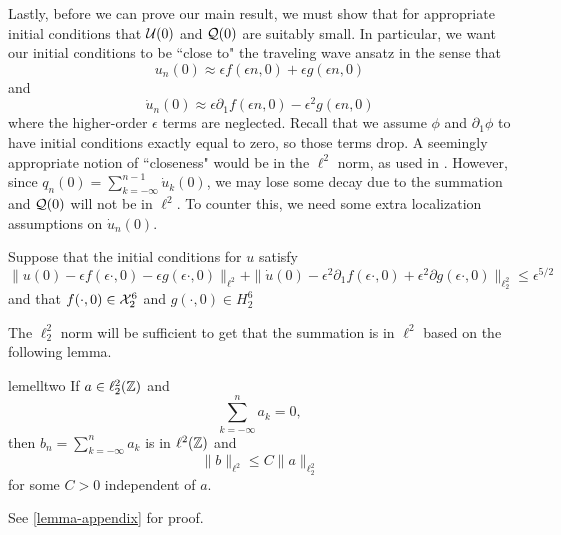 

Lastly, before we can prove our main result, we must show that for appropriate initial conditions that \(\mathcal{U}(0)\) and \(\mathcal{Q}(0)\) are suitably small. In particular, we want our initial conditions to be ``close to" the traveling wave ansatz in the sense that 
\begin{equation}
	u_n(0) \approx \epsilon f(\epsilon n , 0) + \epsilon g(\epsilon n , 0)
\end{equation}
and 
\begin{equation}
	\dot u_n(0) \approx \epsilon \partial_1 f(\epsilon n , 0) -\epsilon^2 g(\epsilon n,0)
\end{equation}
where the higher-order \(\epsilon\) terms are neglected. Recall that we assume \(\phi\) and \(\partial_1\phi\) to have initial conditions exactly equal to zero, so those terms drop. A seemingly appropriate notion of ``closeness" would be in the \(\ell^2\) norm, as used in \cite{khan2017long,schneider2000counter}. However, since \(q_n(0) = \sum_{k=-\infty}^{n-1} \dot u_{k}(0)\), we may lose some decay due to the summation and \(\mathcal{Q}(0)\) will not be in \(\ell^2\). To counter this, we need some extra localization assumptions on \(\dot u_n(0)\).

\begin{assum}\label{assumption-3}
	Suppose that the initial conditions for \(u\) satisfy
	\begin{equation}
		\| u(0) - \epsilon f(\epsilon \cdot, 0) - \epsilon g(\epsilon \cdot, 0) \|_{\ell^2} + \| \dot u(0) - \epsilon^2 \partial_1 f(\epsilon \cdot, 0) + \epsilon^2 \partial g (\epsilon \cdot , 0) \|_{\ell^2_2} \leq \epsilon^{5/2}
	\end{equation}
	and that \(f(\cdot, 0) \in \mathcal{X}^6_2\) and \(g(\cdot, 0) \in H^6_2\)
\end{assum}

The \(\ell^2_2\) norm will be sufficient to get that the summation is in \(\ell^2\) based on the following lemma.
\begin{restatable}{lem}{elltwo}
\label{ell22-lemma}
	If \(a\in \ell^2_2(\mathbb{Z})\) and 
	\begin{equation}
		\sum_{k=-\infty}^n a_k = 0,
	\end{equation}
	then \(b_n = \sum_{k=-\infty}^n a_k\) is in \(\ell^2(\mathbb{Z})\) and 
	\begin{equation}
		\|b\|_{\ell^2} \leq C \|a\|_{\ell^2_2}
	\end{equation}
	for some \(C> 0\) independent of \(a\).
\end{restatable} 
See \cref{lemma-appendix} for proof.



